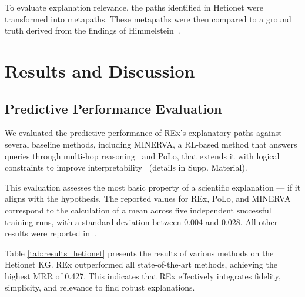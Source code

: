 \documentclass{article}
\theoremstyle{definition}
\begin{document}
To evaluate explanation relevance, the paths identified in Hetionet were transformed into metapaths. These metapaths were then compared to a ground truth derived from the findings of Himmelstein~\cite{himmelstein2017systematic}.


\section{Results and Discussion}

\subsection{Predictive Performance Evaluation}
 We evaluated the predictive performance of REx’s explanatory paths against several baseline methods, including MINERVA, a RL-based method that answers queries through multi-hop reasoning~\cite{das2017minerva} and PoLo, that extends it with logical constraints to improve interpretability~\cite{liu2021neural} (details in Supp. Material).

This evaluation assesses the most basic property of a scientific explanation --- if it aligns with the hypothesis. The reported values for REx, PoLo, and MINERVA correspond to the calculation of a mean across five independent successful training runs, with a standard deviation between 0.004 and 0.028. All other results were reported in~\cite{liu2021neural}.


Table \ref{tab:results_hetionet} presents the results of various methods on the Hetionet KG. REx outperformed all state-of-the-art methods, achieving the highest MRR of 0.427. This indicates that REx effectively integrates fidelity, simplicity, and relevance to find robust explanations.
\end{document}
